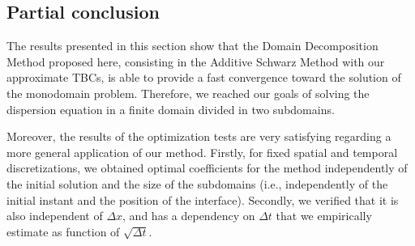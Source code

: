 \subsection{Partial conclusion}
 
\indent The results presented in this section show that the Domain Decomposition Method proposed here, consisting in the Additive Schwarz Method with our approximate TBCs, is able to provide a fast convergence toward the solution of the monodomain problem. Therefore, we reached our goals of solving the dispersion equation in a finite domain divided in two subdomains.

\indent Moreover, the results of the optimization tests are very satisfying regarding a more general application of our method. Firstly, for fixed spatial and temporal discretizations, we obtained optimal coefficients for the method independently of the initial solution and the size of the subdomains (i.e., independently of the initial instant and the position of the interface). Secondly, we verified that it is also independent of $\Delta x$, and has a dependency on $\Delta t$ that we empirically estimate as function of $\sqrt{\Delta t}$.